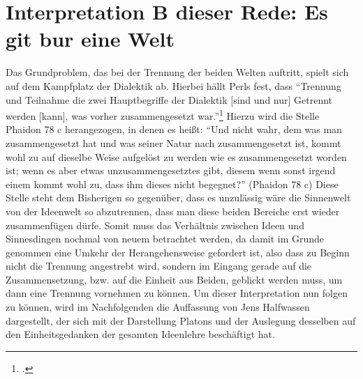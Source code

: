 \section{Interpretation B dieser Rede: Es git bur eine Welt}
Das Grundproblem, das bei der Trennung der beiden Welten auftritt, spielt sich auf dem Kampfplatz der Dialektik ab. Hierbei hällt Perls fest, dass \enquote{Trennung und Teilnahme die zwei Hauptbegriffe der Dialektik [sind und nur] Getrennt werden [kann], was vorher zusammengesetzt war.}\footcite[vgl.][S. 349]{Perls}
Hierzu wird die Stelle Phaidon 78 c herangezogen, in denen es heißt:
\enquote{Und nicht wahr, dem was man zusammengesetzt hat und was seiner Natur nach zusammengesetzt ist, kommt wohl zu auf dieselbe Weise aufgelöst zu werden wie es zusammengesetzt worden ist; wenn es aber etwas unzusammengesetztes gibt, diesem wenn sonst irgend einem kommt wohl zu, dass ihm dieses nicht begegnet?} (Phaidon 78 c)
Diese Stelle steht dem Bisherigen so gegenüber, dass es unzulässig wäre die Sinnenwelt von der Ideenwelt so abzutrennen, dass man diese beiden Bereiche erst wieder zusammenfügen dürfe.
Somit muss das Verhältnis zwischen Ideen und Sinnesdingen nochmal von neuem betrachtet werden, da damit im Grunde genommen eine Umkehr der Herangehensweise gefordert ist, also dass zu Beginn nicht die Trennung angestrebt wird, sondern im Eingang gerade auf die Zusammensetzung, bzw. auf die Einheit aus Beiden, geblickt werden muss, um dann eine Trennung vornehmen zu können.
Um dieser Interpretation nun folgen zu können, wird im Nachfolgenden die Auffassung von Jens Halfwassen dargestellt, der sich mit der Darstellung Platons und der Auslegung desselben auf den Einheitsgedanken der gesamten Ideenlehre beschäftigt hat.


